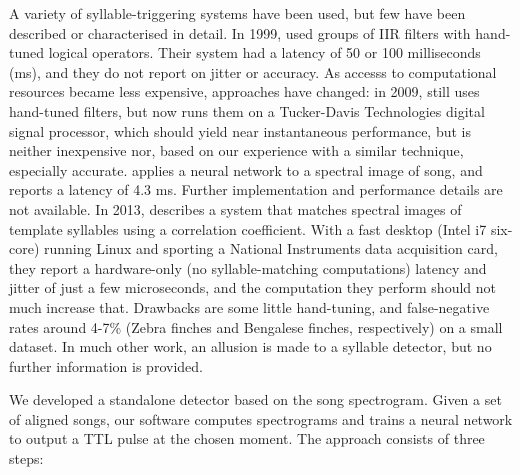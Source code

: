 \documentclass[10pt,letterpaper]{article}
\begin{document}
A variety of syllable-triggering systems have been used, but few have been described or characterised in detail.  In 1999, \cite{Leonardo1999}  used groups of IIR filters with hand-tuned logical operators.  Their system had a latency of 50 or 100 milliseconds (ms), and they do not report on jitter or accuracy.  As accesss to computational resources became less expensive, approaches have changed: in 2009, \cite{Andalman2009} still uses hand-tuned filters, but now runs them on a Tucker-Davis Technologies digital signal processor, which should yield near instantaneous performance, but is neither inexpensive nor, based on our experience with a similar technique, especially accurate.  \cite{Keller2009} applies a neural network to a spectral image of song, and reports a latency of 4.3 ms.  Further implementation and performance details are not available.  In 2013, \cite{Skocik2013} describes a system that matches spectral images of template syllables using a correlation coefficient.  With a fast desktop (Intel i7 six-core) running Linux and sporting a National Instruments data acquisition card, they report a hardware-only (no syllable-matching computations) latency and jitter of just a few microseconds, and the computation they perform should not much increase that.  Drawbacks are some little hand-tuning, and false-negative rates around 4-7\% (Zebra finches and Bengalese finches, respectively) on a small dataset.  In much other work, an allusion is made to a syllable detector, but no further information is provided.

We developed a standalone detector based on the song
spectrogram. Given a set of aligned songs, our software computes
spectrograms and trains a neural network to output a TTL pulse at the
chosen moment. The approach consists of three steps:
\end{document}
